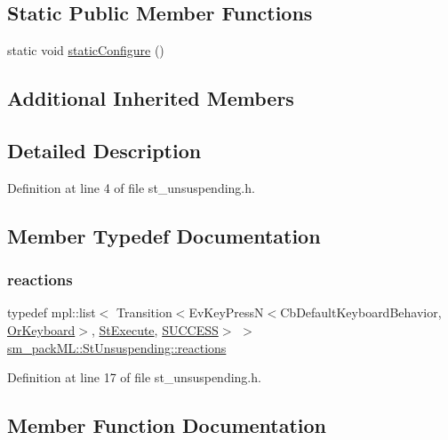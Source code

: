 \subsection*{Static Public Member Functions}
\begin{DoxyCompactItemize}
\item 
static void \hyperlink{structsm__packML_1_1StUnsuspending_a1d0786e13bbfe99d470bed2ff98874ec}{static\+Configure} ()
\end{DoxyCompactItemize}
\subsection*{Additional Inherited Members}


\subsection{Detailed Description}


Definition at line 4 of file st\+\_\+unsuspending.\+h.



\subsection{Member Typedef Documentation}
\mbox{\label{structsm__packML_1_1StUnsuspending_aee6c7c57b9289d53b71b22234277eed3}} 
\subsubsection{\texorpdfstring{reactions}{reactions}}
{\footnotesize\ttfamily typedef mpl\+::list$<$ Transition$<$Ev\+Key\+PressN$<$Cb\+Default\+Keyboard\+Behavior, \hyperlink{classsm__packML_1_1OrKeyboard}{Or\+Keyboard}$>$, \hyperlink{structsm__packML_1_1StExecute}{St\+Execute}, \hyperlink{classSUCCESS}{S\+U\+C\+C\+E\+SS}$>$ $>$ \hyperlink{structsm__packML_1_1StUnsuspending_aee6c7c57b9289d53b71b22234277eed3}{sm\+\_\+pack\+M\+L\+::\+St\+Unsuspending\+::reactions}}



Definition at line 17 of file st\+\_\+unsuspending.\+h.



\subsection{Member Function Documentation}
\mbox{\label{structsm__packML_1_1StUnsuspending_acd61f286c4c4378cc207d7e52bb7e373}} 
